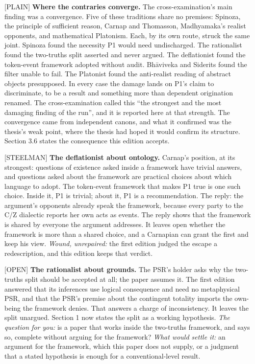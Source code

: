 \documentclass[11pt]{article}
\newcommand{\register}[1]{{\ttfamily\small #1}}
\begin{document}
\register{[PLAIN]} \textbf{Where the contraries converge.} The cross-examination's main finding was a convergence. Five of these traditions share no premises: Spinoza, the principle of sufficient reason, Carnap and Thomasson, Madhyamaka's realist opponents, and mathematical Platonism. Each, by its own route, struck the same joint. Spinoza found the necessity P1 would need undischarged. The rationalist found the two-truths split asserted and never argued. The deflationist found the token-event framework adopted without audit. Bhāviveka and Siderits found the filter unable to fail. The Platonist found the anti-realist reading of abstract objects presupposed. In every case the damage lands on P1's claim to discriminate, to be a result and something more than dependent origination renamed. The cross-examination called this ``the strongest and the most damaging finding of the run'', and it is reported here at that strength. The convergence came from independent canons, and what it confirmed was the thesis's weak point, where the thesis had hoped it would confirm its structure. Section 3.6 states the consequence this edition accepts.

\register{[STEELMAN]} \textbf{The deflationist about ontology.} Carnap's position, at its strongest: questions of existence asked inside a framework have trivial answers, and questions asked about the framework are practical choices about which language to adopt. The token-event framework that makes P1 true is one such choice. Inside it, P1 is trivial; about it, P1 is a recommendation. The reply: the argument's opponents already speak the framework, because every party to the C/\allowbreak{}Z dialectic reports her own acts as events. The reply shows that the framework is shared by everyone the argument addresses. It leaves open whether the framework is more than a shared choice, and a Carnapian can grant the first and keep his view. \emph{Wound, unrepaired:} the first edition judged the escape a redescription, and this edition keeps that verdict.

\register{[OPEN]} \textbf{The rationalist about grounds.} The PSR's holder asks why the two-truths split should be accepted at all; the paper assumes it. The first edition answered that its inferences use logical consequence and need no metaphysical PSR, and that the PSR's premise about the contingent totality imports the own-being the framework denies. That answers a charge of inconsistency. It leaves the split unargued. Section 1 now states the split as a working hypothesis. \emph{The question for you:} is a paper that works inside the two-truths framework, and says so, complete without arguing for the framework? \emph{What would settle it:} an argument for the framework, which this paper does not supply, or a judgment that a stated hypothesis is enough for a conventional-level result.
\end{document}
